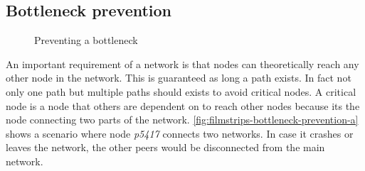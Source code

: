 \subsection{Bottleneck prevention}

\begin{figure}[htb!]
  \centering
	\caption{Preventing a bottleneck}
\label{fig:filmstrips-bottleneck-prevention}
\end{figure}

An important requirement of a network is that nodes can theoretically reach any other node in the network. This is guaranteed as long a path exists. In fact not only one path but multiple paths should exists to avoid critical nodes. A critical node is a node that others are dependent on to reach other nodes because its the node connecting two parts of the network. \vref{fig:filmstrips-bottleneck-prevention-a} shows a scenario where node \textit{p5417} connects two networks. In case it crashes or leaves the network, the other peers would be disconnected from the main network.


